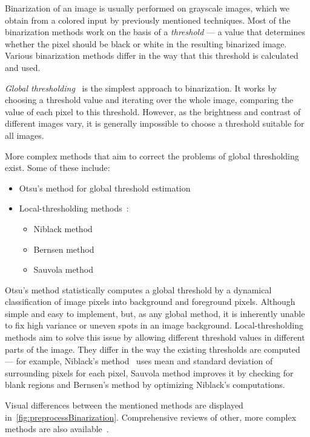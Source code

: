 Binarization of an image is usually performed on grayscale images, which we obtain from a colored input by previously mentioned techniques. Most of the binarization methods work on the basis of a \emph{threshold} --- a value that determines whether the pixel should be black or white in the resulting binarized image. Various binarization methods differ in the way that this threshold is calculated and used.

\emph{Global thresholding}~\citep{globalThresh} is the simplest approach to binarization. It works by choosing a threshold value and iterating over the whole image, comparing the value of each pixel to this threshold. However, as the brightness and contrast of different images vary, it is generally impossible to choose a threshold suitable for all images.

More complex methods that aim to correct the problems of global thresholding exist. Some of these include:
\begin{itemize}
\item Otsu's method for global threshold estimation~\citep{otsu}
\item Local-thresholding methods~\citep{localOtherBin}:
\begin{itemize}
\item Niblack method
\item Bernsen method
\item Sauvola method
\end{itemize}
\end{itemize}

Otsu's method statistically computes a global threshold by a dynamical classification of image pixels into background and foreground pixels. Although simple and easy to implement, but, as any global method, it is inherently unable to fix high variance or uneven spots in an image background. Local-thresholding methods aim to solve this issue by allowing different threshold values in different parts of the image. They differ in the way the existing thresholds are computed --- for example, Niblack's method~\citep{adaptiveBin} uses mean and standard deviation of surrounding pixels for each pixel, Sauvola method improves it by checking for blank regions and Bernsen's method by optimizing Niblack's computations. 

Visual differences between the mentioned methods are displayed in~\cref{fig:preprocessBinarization}. Comprehensive reviews of other, more complex methods are also available~\citep{localOtherBin}.

